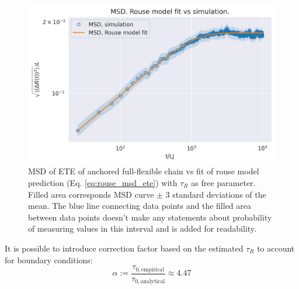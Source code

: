 \documentclass[
    paper=A4,pagesize=automedia,fontsize=12pt,
    BCOR=15mm,DIV=22,
    twoside,headinclude,footinclude=false,
    ngerman,fleqn,             %
    bibliography=totocnumbered,          %
    listof=totoc,                %
    listof=flat,                 %
    cleardoublepage=empty      %
    numbers=endperiod
]{scrartcl}
\begin{document}
\begin{figure}[h]
    \begin{center}
      \includegraphics[width=\columnwidth,trim={0cm 0cm 0cm 0.8cm},clip]{3-exp-free-param-log.png}
      \caption{\label{fig:anchored_flex_chain_vs_rouse_fitted}
      MSD of ETE of anchored full-flexible chain vs fit of rouse model prediction 
      (Eq. \ref{eq:rouse_msd_ete}) with $\tau_R$ as free parameter.
      Filled area corresponds MSD curve $\pm$ 3 standard deviations of the mean. The
      blue line connecting data points and the filled area between data points doesn't make
      any statements about probability of measuring values in this interval and is
      added for readability.
      }
    \end{center}
\end{figure}

It is possible to introduce correction factor based on the estimated $\tau_R$
to account for boundary conditions:
\begin{equation}
    \alpha := \frac{\tau_{0, \textrm{empirical}}}{\tau_{0, \textrm{analytical}}} \approx 4.47
\end{equation}
\end{document}
